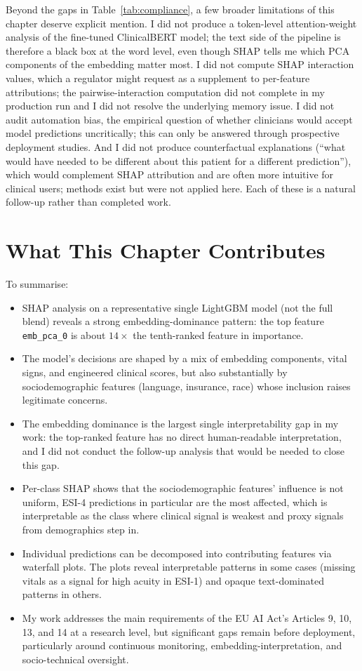 Beyond the gaps in Table~\ref{tab:compliance}, a few broader limitations of this chapter deserve explicit mention. I did not produce a token-level attention-weight analysis of the fine-tuned ClinicalBERT model; the text side of the pipeline is therefore a black box at the word level, even though SHAP tells me which PCA components of the embedding matter most. I did not compute SHAP interaction values, which a regulator might request as a supplement to per-feature attributions; the pairwise-interaction computation did not complete in my production run and I did not resolve the underlying memory issue. I did not audit automation bias, the empirical question of whether clinicians would accept model predictions uncritically; this can only be answered through prospective deployment studies. And I did not produce counterfactual explanations (``what would have needed to be different about this patient for a different prediction''), which would complement SHAP attribution and are often more intuitive for clinical users; methods exist \citep{wachter2017counterfactual} but were not applied here. Each of these is a natural follow-up rather than completed work.

\section{What This Chapter Contributes}

To summarise:

\begin{itemize}
 \item SHAP analysis on a representative single LightGBM model (not the full blend) reveals a strong embedding-dominance pattern: the top feature \texttt{emb\_pca\_0} is about $14\times$ the tenth-ranked feature in importance.
 \item The model's decisions are shaped by a mix of embedding components, vital signs, and engineered clinical scores, but also substantially by sociodemographic features (language, insurance, race) whose inclusion raises legitimate concerns.
 \item The embedding dominance is the largest single interpretability gap in my work: the top-ranked feature has no direct human-readable interpretation, and I did not conduct the follow-up analysis that would be needed to close this gap.
 \item Per-class SHAP shows that the sociodemographic features' influence is not uniform, ESI-4 predictions in particular are the most affected, which is interpretable as the class where clinical signal is weakest and proxy signals from demographics step in.
 \item Individual predictions can be decomposed into contributing features via waterfall plots. The plots reveal interpretable patterns in some cases (missing vitals as a signal for high acuity in ESI-1) and opaque text-dominated patterns in others.
 \item My work addresses the main requirements of the EU AI Act's Articles 9, 10, 13, and 14 at a research level, but significant gaps remain before deployment, particularly around continuous monitoring, embedding-interpretation, and socio-technical oversight.
\end{itemize}

